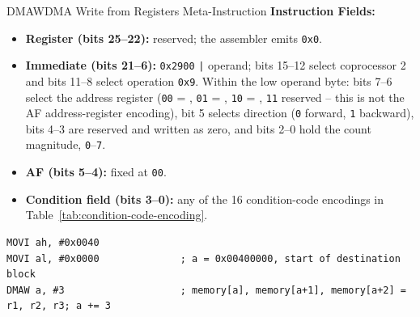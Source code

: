 \begin{instructionbox}{DMAW}{DMA Write from Registers Meta-Instruction}
	\textbf{Instruction Fields:}
	\begin{itemize}
		\item \textbf{Register (bits 25--22):} reserved; the assembler emits \texttt{0x0}.
		\item \textbf{Immediate (bits 21--6):} \texttt{0x2900} \texttt{|} operand; bits 15--12 select coprocessor 2 and
		      bits 11--8 select operation \texttt{0x9}. Within the low operand byte: bits 7--6 select the address
		      register (\texttt{00} = , \texttt{01} = , \texttt{10} = , \texttt{11} reserved --
		      this is not the AF address-register encoding), bit 5 selects direction (\texttt{0} forward, \texttt{1}
		      backward), bits 4--3 are reserved and written as zero, and bits 2--0 hold the count magnitude,
		      \texttt{0}--\texttt{7}.
		\item \textbf{AF (bits 5--4):} fixed at \texttt{00}.
		\item \textbf{Condition field (bits 3--0):} any of the 16 condition-code encodings in
		      Table~\ref{tab:condition-code-encoding}.
	\end{itemize}

	\begin{example}
		\begin{lstlisting}
MOVI ah, #0x0040
MOVI al, #0x0000              ; a = 0x00400000, start of destination block
DMAW a, #3                    ; memory[a], memory[a+1], memory[a+2] = r1, r2, r3; a += 3
		\end{lstlisting}
		\caption{Writing Registers to a Memory Block}
	\end{example}
\end{instructionbox}

